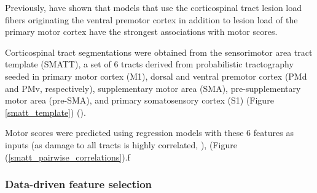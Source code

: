 \documentclass[10pt]{article}
\begin{document}
Previously, \cite{Ito2022-em} have shown that models that use the corticospinal tract lesion load fibers originating the ventral premotor cortex in addition to lesion load of the primary motor cortex have the strongest associations with motor scores.

Corticospinal tract segmentations were obtained from the sensorimotor area tract template (SMATT), a set of 6 tracts derived from probabilistic tractography seeded in primary motor cortex (M1), dorsal and ventral premotor cortex (PMd and PMv, respectively), supplementary motor area (SMA), pre-supplementary motor area (pre-SMA), and primary somatosensory cortex (S1) (Figure \ref{smatt_template}) (\cite{Archer2018-ti}).

Motor scores were predicted using regression models with these 6 features as inputs (as damage to all tracts is highly correlated, \cite{Ito2022-em}), (Figure (\ref{smatt_pairwise_correlations}).f

\subsubsection{Data-driven feature selection}
\end{document}
